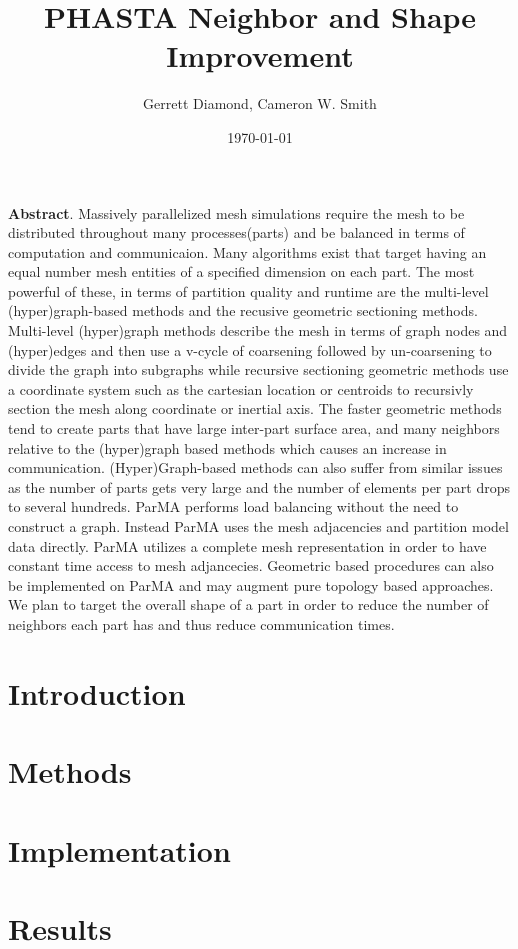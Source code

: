 \documentclass[a4paper]{article}
\title{PHASTA Neighbor and Shape Improvement}
\author{Gerrett Diamond, Cameron W. Smith}
\date{\today}
\begin{document}
\maketitle

\textbf{Abstract}. 
Massively parallelized mesh simulations require the mesh to be distributed
throughout many processes(parts) and be balanced in terms of computation and
communicaion. 
Many algorithms exist that target having an equal number mesh entities of a
specified dimension on each part. 
The most powerful of these, in terms of partition quality and runtime are the
multi-level (hyper)graph-based methods and the recusive geometric sectioning
methods. 
Multi-level (hyper)graph methods describe the mesh in terms of graph nodes and
(hyper)edges and then use a v-cycle of coarsening followed by un-coarsening to
divide the graph into subgraphs while recursive sectioning geometric methods use
a coordinate system such as the cartesian location or centroids to recursivly
section the mesh along coordinate or inertial axis. 
The faster geometric methods tend to create parts that have large inter-part
surface area, and many neighbors relative to the (hyper)graph based methods
which causes an increase in communication.
(Hyper)Graph-based methods can also suffer from similar issues as the number of
parts gets very large and the number of elements per part drops to several
hundreds. 
ParMA performs load balancing without the need to construct a
graph. 
Instead ParMA uses the mesh adjacencies and partition model data directly.
ParMA utilizes a complete mesh representation in order to have constant time 
access to mesh adjancecies.
Geometric based procedures can also be implemented on ParMA and may augment
 pure topology based approaches.
We plan to target the overall shape of a part in order to reduce the number of
neighbors each part has and thus reduce communication times.  
 
\section{Introduction}

\section{Methods}


\section{Implementation}

\section{Results}

\newpage


\end{document}
